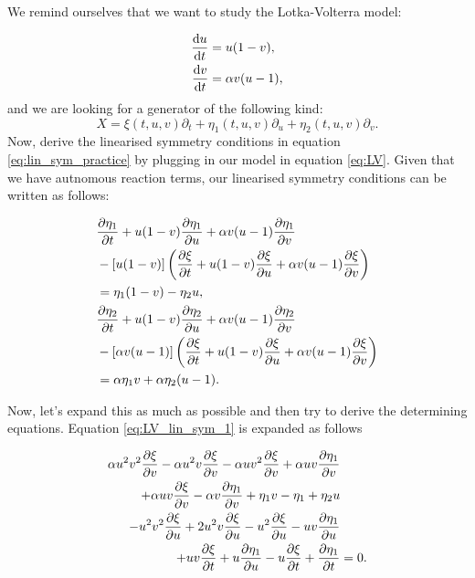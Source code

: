 We remind ourselves that we want to study the Lotka-Volterra model:

\begin{equation*}
  \begin{split}
    \dv{u}{t}&=u(1-v),\\
    \dv{v}{t}&=\alpha v(u-1),\\    
    \end{split}
\end{equation*}
and we are looking for a generator of the following kind:
\begin{equation}
X=\xi(t,u,v)\partial_t+\eta_1(t,u,v)\partial_u+\eta_2(t,u,v)\partial_v.
\end{equation}
Now, derive the linearised symmetry conditions in equation \eqref{eq:lin_sym_practice} by plugging in our model in equation \eqref{eq:LV}. Given that we have autnomous reaction terms, our linearised symmetry conditions can be written as follows:


\begin{align}
    &\pdv{\eta_1}{t}+u(1-v)\pdv{\eta_1}{u}+\alpha v(u-1)\pdv{\eta_1}{v}\nonumber\\
    &-\left[u(1-v)\right]\left(\pdv{\xi}{t}+u(1-v)\pdv{\xi}{u}+\alpha v(u-1)\pdv{\xi}{v}\right)\label{eq:LV_lin_sym_1}\\
    &=\eta_1(1-v)-\eta_2 u,\nonumber\\
    &\pdv{\eta_2}{t}+u(1-v)\pdv{\eta_2}{u}+\alpha v(u-1)\pdv{\eta_2}{v}\nonumber\\
    &-\left[\alpha v(u-1)\right]\left(\pdv{\xi}{t}+u(1-v)\pdv{\xi}{u}+\alpha v(u-1)\pdv{\xi}{v}\right)\label{eq:LV_lin_sym_2}\\
    &=\alpha\eta_1 v+\alpha\eta_2(u-1).\nonumber
\end{align}




Now, let's expand this as much as possible and then try to derive the determining equations. Equation \eqref{eq:LV_lin_sym_1} is expanded as follows



\begin{align}
  \alpha u^{2} v^{2} \pdv{\xi}{v}  - \alpha u^{2} v \pdv{\xi}{v} - \alpha u v^{2} \pdv{\xi}{v} + \alpha u v \pdv{\eta_1}{v}&\nonumber\\
  + \alpha u v \pdv{\xi}{v}  - \alpha v \pdv{\eta_1}{v}  + \eta_1 v - \eta_1 + \eta_2 u &\nonumber\\
  - u^{2} v^{2} \pdv{\xi}{u}  + 2 u^{2} v \pdv{\xi}{u}  - u^{2} \pdv{\xi}{u}  - u v \pdv{\eta_1}{u}&\label{eq:LV_lin_sym_1_expanded}\\
  + u v \pdv{\xi}{t}+ u \pdv{\eta_1}{u}  - u \pdv{\xi}{t}+ \pdv{\eta_1}{t}&=0.\nonumber
\end{align}



